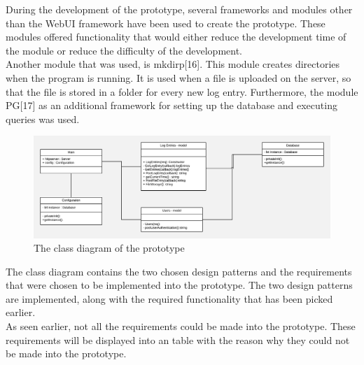 \documentclass[paper=a4, fontsize=11pt,twoside]{scrartcl}	%
\begin{document}
During the development of the prototype, several frameworks and modules other than the WebUI framework have been used to create the prototype. These modules offered functionality that would either reduce the development time of the module or reduce the difficulty of the development. \\
Another module that was used, is mkdirp[16]. This module creates directories when the program is running. It is used when a file is uploaded on the server, so that the file is stored in a folder for every new log entry. Furthermore, the module PG[17] as an additional framework for setting up the database and executing queries was used. 



\begin{figure}[H]
\includegraphics[scale=0.35]{class_diagram}
\caption{The class diagram of the prototype}
\end{figure}
\noindent
The class diagram contains the two chosen design patterns and the requirements that were chosen to be implemented into the prototype. The two design patterns are implemented, along with the required functionality that has been picked earlier.\\
As seen earlier, not all the requirements could be made into the prototype. These requirements will be displayed into an table with the reason why they could not be made into the prototype.
\end{document}
